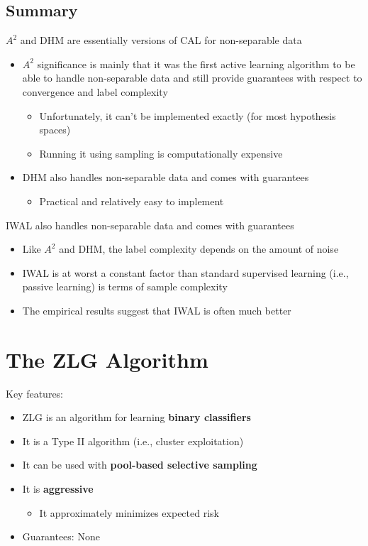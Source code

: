 \documentclass[10pt]{article}
\begin{document}
\subsection*{Summary}
$A^2$ and DHM are essentially versions of CAL for non-separable data
\begin{itemize}
	\item $A^2$ significance is mainly that it was the first active learning algorithm to be able to handle non-separable data and still provide guarantees with respect to convergence and label complexity
	\begin{itemize}
	    \item Unfortunately, it can't be implemented exactly (for most hypothesis spaces)
	    \item Running it using sampling is computationally expensive
    \end{itemize}
    \item DHM also handles non-separable data and comes with guarantees
    \begin{itemize}
	    \item Practical and relatively easy to implement
    \end{itemize}
\end{itemize}
IWAL also handles non-separable data and comes with guarantees
\begin{itemize}
	\item Like $A^2$ and DHM, the label complexity depends on the amount of noise
	\item IWAL is at worst a constant factor than standard supervised learning (i.e., passive learning) is terms of sample complexity
	\item The empirical results suggest that IWAL is often much better
\end{itemize}

\section*{The ZLG Algorithm}
Key features:
\begin{itemize}
	\item ZLG is an algorithm for learning \textbf{binary classifiers}
	\item It is a Type II algorithm (i.e., cluster exploitation)
	\item It can be used with \textbf{pool-based selective sampling}
	\item It is \textbf{aggressive}
	\begin{itemize}
	    \item It approximately minimizes expected risk
    \end{itemize}
    \item Guarantees: None
\end{itemize}
\end{document}
